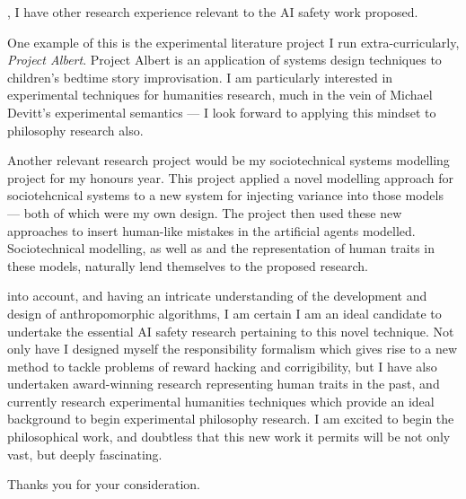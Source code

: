 , I have other research experience relevant to the AI safety work proposed.\par
One example of this is the experimental literature project I run extra-curricularly, \emph{Project Albert}. Project Albert is an application of systems design techniques to children's bedtime story improvisation. I am particularly interested in experimental techniques for humanities research, much in the vein of Michael Devitt's experimental semantics --- I look forward to applying this mindset to philosophy research also.\par
Another relevant research project would be my sociotechnical systems modelling project for my honours year. This project applied a novel modelling approach for sociotehcnical systems to a new system for injecting variance into those models --- both of which were my own design. The project then used these new approaches to insert human-like mistakes in the artificial agents modelled. Sociotechnical modelling, as well as and the representation of human traits in these models, naturally lend themselves to the proposed research.\par

 into account, and having an intricate understanding of the development and design of anthropomorphic algorithms, I am certain I am an ideal candidate to undertake the essential AI safety research pertaining to this novel technique. Not only have I designed myself the responsibility formalism which gives rise to a new method to tackle problems of reward hacking and corrigibility, but I have also undertaken award-winning research representing human traits in the past, and currently research experimental humanities techniques which provide an ideal background to begin experimental philosophy research. I am excited to begin the philosophical work, and doubtless that this new work it permits will be not only vast, but deeply fascinating.\par
Thanks you for your consideration.

